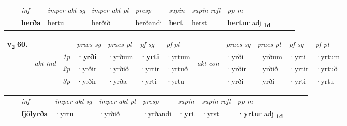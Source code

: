 \begin{tabular}{llllllllllll}
 & & \textit{inf} & \textit{imper akt sg} & \textit{imper akt pl}   & \textit{presp} & \textit{supin} & \textit{supin refl} & \textit{pp m}     \\*
  & & \textbf{herða} & hertu  & herðið   & herðandi &  \textbf{hert} & herst & \textbf{hertur} adj \textbf{\textsubscript{1d}} \\*
\cmidrule{1-12}
\end{tabular}



\begin{tabular}{llllllllllll} \toprule
\multirow{4}{*}{{{\textbf{v{\textsubscript{2}}} \Large{\textbf{60.}}}}}  & &   &  \textit{praes sg}  & \textit{praes pl}  &\textit{ pf sg} & \textit{pf pl} &  &  \textit{praes sg}  & \textit{praes pl}  & \textit{pf sg} & \textit{pf pl } \\*
	\cmidrule{4-7} \cmidrule{9-12}
 & \multirow{3}{*}{\begin{turn}{90}\textit{akt ind}\end{turn}} & {\textit{1p}} & \textbf{·yrði} & ·yrðum    & \textbf{·yrti} & ·yrtum & \multirow{3}{*}{\begin{turn}{90}\textit{akt con}\end{turn}} &·yrði & ·yrðum & ·yrti & ·yrtum\\*
& &  {\textit{2p}} &  ·yrðir  & ·yrðið   & ·yrtir & ·yrtuð & & ·yrðir & ·yrðið & ·yrtir & ·yrtuð \\*
& &  {\textit{3p}} & ·yrðir & ·yrða   & ·yrti & ·yrtu & & ·yrði & ·yrði& ·yrti & ·yrtu  \\*
\cmidrule{4-7} \cmidrule{9-12}
\end{tabular}


\begin{tabular}{llllllllllll}
 & & \textit{inf} & \textit{imper akt sg} & \textit{imper akt pl}   & \textit{presp} & \textit{supin} & \textit{supin refl} & \textit{pp m}     \\*
  & & \textbf{fjölyrða} & ·yrtu  & ·yrðið   & ·yrðandi &  \textbf{·yrt} & ·yrst & \textbf{·yrtur} adj \textbf{\textsubscript{1d}} \\*
\cmidrule{1-12}
\end{tabular}



